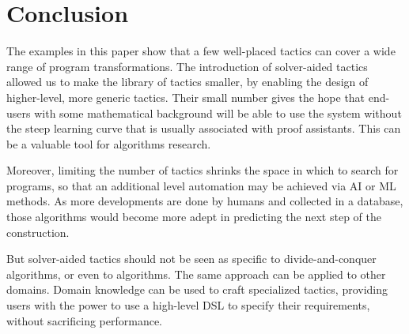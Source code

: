 \section{Conclusion}
\label{conc}

The examples in this paper show that a few well-placed tactics can cover a wide range
of program transformations. The introduction of solver-aided tactics allowed us to make
the library of tactics smaller, by enabling the design of higher-level, more generic
tactics. Their small number gives the hope that end-users with some mathematical background
will be able to use the system without the steep learning curve that is usually associated
with proof assistants. This can be a valuable tool for algorithms research.

Moreover, limiting the number of tactics shrinks the space in which to search for programs,
so that an additional level automation may be achieved via AI or ML methods. As more
developments are done by humans and collected in a database, those algorithms would become
more adept in predicting the next step of the construction.

But solver-aided tactics should not be seen as specific to divide-and-conquer algorithms,
or even to algorithms. The same approach can be applied to other domains. Domain knowledge
can be used to craft specialized tactics, providing users with the power to use a high-level
DSL to specify their requirements, without sacrificing performance.
